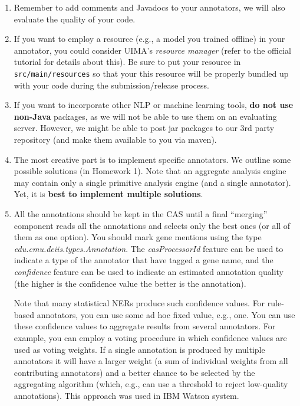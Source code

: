 \begin{enumerate}

\item Remember to add comments and Javadocs to your annotators, we will also
evaluate the quality of your code.

\item If you want to employ a resource (e.g., a model you trained offline) in
your annotator, you could consider UIMA's \emph{resource manager} (refer to the
official tutorial for details about this).
Be sure to put your resource in \texttt{src/main/resources} so 
that your this resource will be properly bundled up with your code
during the submission/release process.

\item If you want to incorporate other NLP or machine learning tools,
\textbf{do not use non-Java} packages, as we will not be able to use them
on an evaluating server. 
However, we might be able to post jar packages 
to our 3rd party repository (and make them available to you via maven).

\item The most creative part is to implement specific annotators. We
outline some possible solutions (in Homework 1). 
Note that an aggregate analysis engine may contain only a single
primitive analysis engine (and a single annotator). 
Yet, it is \textbf{best to implement multiple solutions}.

\item All the annotations should be kept in the CAS until a final
``merging'' component reads all the annotations and selects only
the best ones (or all of them as one option).
You should mark gene mentions using the type \emph{edu.cmu.deiis.types.Annotation}.
The \emph{casProcessorId} feature 
can be used to indicate a type of the annotator that have tagged a gene name, 
and the \emph{confidence} feature 
can be used to indicate 
an estimated annotation quality (the higher is the confidence value the better
is the annotation).

Note that many statistical NERs produce such confidence values.
For rule-based annotators, you can use some ad hoc fixed value, e.g., one.
You can use these confidence values to aggregate results from several annotators.
For example, you can employ a voting procedure 
in which confidence values are used as voting weights.
If a single annotation is produced by multiple annotators it will have a larger weight
(a sum of individual weights from all contributing annotators)
and a better chance to be selected by the aggregating algorithm (which, e.g.,
can use a threshold to reject low-quality annotations).
This approach was used in IBM Watson system.

\end{enumerate}
